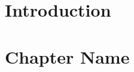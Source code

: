 \documentclass[notitlepage]{report}
\begin{document}
  \createintro
  \newpage

  \setcounter{chapter}{-1}
  \chapter{Introduction}

  

  \newpage
  \setcounter{page}{1}

  \chapter{Chapter Name}

  
  
  
  
  
  
  
  
  
  
  
  
  
  
\end{document}
